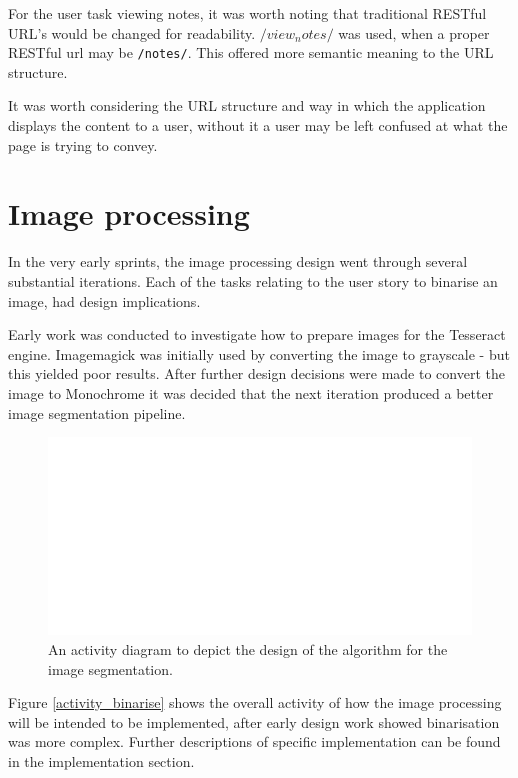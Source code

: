 For the user task viewing notes, it was worth noting that traditional RESTful URL's would be changed for readability. \texttt{$/view_notes/$} was used, when a proper RESTful url may be \texttt{/notes/}. This offered more semantic meaning to the URL structure.

It was worth considering the URL structure and way in which the application displays the content to a user, without it a user may be left confused at what the page is trying to convey.

\section{Image processing}
In the very early sprints, the image processing design went through several substantial iterations. Each of the tasks relating to the user story to binarise an image, had design implications.

Early work was conducted to investigate how to prepare images for the Tesseract engine. Imagemagick was initially used by converting the image to grayscale - but this yielded poor results. After further design decisions were made to convert the image to Monochrome it was decided that the next iteration produced a better image segmentation pipeline.

\begin{figure}[h]
  \centering
  \includegraphics[scale=0.5]{images/image_binarisation_activity.pdf}
  \caption{An activity diagram to depict the design of the algorithm for the image segmentation.}
  \label{fig:activity_binarise}
\end{figure}

Figure \ref{activity_binarise} shows the overall activity of how the image processing will be intended to be implemented, after early design work showed binarisation was more complex. Further descriptions of specific implementation can be found in the implementation section.

